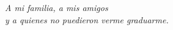 
\thispagestyle{empty}
{}

\hfill
\vfill

\begin{flushright}

\itshape
A mi familia, a mis amigos \\
y a quienes no puedieron verme graduarme.

\end{flushright}

\vfill

\cleardoublepage
\endinput
